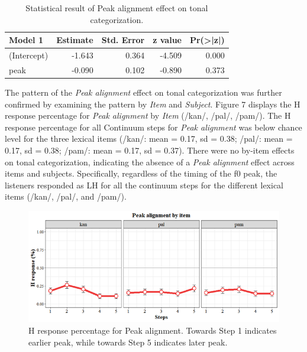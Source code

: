 \documentclass[
  man,floatsintext]{apa6}
\begin{document}
\begin{table}[H]

\caption{\label{tab:table2}Statistical result of Peak alignment effect on tonal categorization.}
\centering
\begin{tabular}[t]{l|r|r|r|r}
\hline
Model 1 & Estimate & Std. Error & z value & Pr(>|z|)\\
\hline
(Intercept) & -1.643 & 0.364 & -4.509 & 0.000\\
\hline
peak & -0.090 & 0.102 & -0.890 & 0.373\\
\hline
\end{tabular}
\end{table}
\newpage

The pattern of the \emph{Peak alignment} effect on tonal categorization was further confirmed by examining the pattern by \emph{Item} and \emph{Subject}. Figure 7 displays the H response percentage for \emph{Peak alignment} by \emph{Item} (/kan/, /pal/, /pam/). The H response percentage for all Continuum steps for \emph{Peak alignment} was below chance level for the three lexical items (/kan/: mean = 0.17, sd = 0.38; /pal/: mean = 0.17, sd = 0.38; /pam/: mean = 0.17, sd = 0.37). There were no by-item effects on tonal categorization, indicating the absence of a \emph{Peak alignment} effect across items and subjects. Specifically, regardless of the timing of the f0 peak, the listeners responded as LH for all the continuum steps for the different lexical items (/kan/, /pal/, and /pam/).

\begin{figure}[H]

{\centering \includegraphics[width=1\linewidth]{images/picture7} 

}

\caption{H response percentage for Peak alignment. Towards Step 1 indicates earlier peak, while towards Step 5 indicates later peak.}\label{fig:picture7}
\end{figure}
\end{document}
